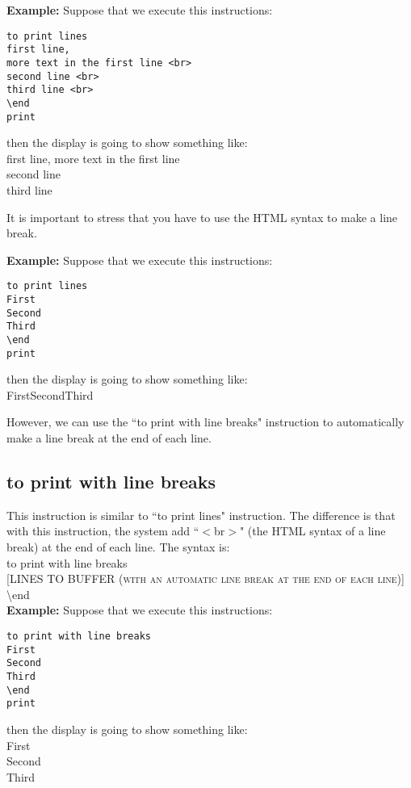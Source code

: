\documentclass[11pt,a4paper,openright,oneside]{book}
\newenvironment{ex}
{
  \setlength{\parindent}{0cm}
  \large \textbf{Example:} \normalsize 
}
{}
\begin{document}
\begin{ex} Suppose that we execute this instructions:
  \begin{lstlisting}
to print lines
first line,
more text in the first line <br>
second line <br>
third line <br>
\end
print
  \end{lstlisting}
then the display is going to show something like: \vspace{5px}\\
\textsf{first line, more text in the first line \\
second line \\
third line \\}
\end{ex}

It is important to stress that you have to use the HTML syntax to make a line break.

\begin{ex} Suppose that we execute this instructions:
  \begin{lstlisting}
to print lines
First
Second
Third
\end
print
  \end{lstlisting}
then the display is going to show something like: \vspace{5px}\\
\textsf{FirstSecondThird\\}
\end{ex}

However, we can use the ``\textsf{to print with line breaks}" instruction to automatically make a line break at the end of each line.

\subsection{\textsf{to print with line breaks}}

This instruction is similar to ``\textsf{to print lines}" instruction. The difference is that with this instruction, the system add ``\textsf{$<$br$>$}" (the HTML syntax of a line break) at the end of each line. The syntax is:
\vspace{5px}\\
\textsf{to print with line breaks} \\
\textsc{\scriptsize[LINES TO BUFFER (with an automatic line break at the end of each line)]} \\
\textsf{\textbackslash end} \\

\begin{ex} Suppose that we execute this instructions:
  \begin{lstlisting}
to print with line breaks
First
Second
Third
\end
print
  \end{lstlisting}
then the display is going to show something like: \vspace{5px}\\
\textsf{First \\
Second \\
Third \\}
\end{ex}
\end{document}
